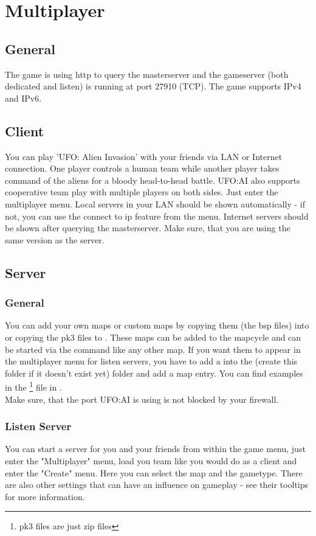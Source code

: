 \section{Multiplayer}
\subsection{General}
The game is using http to query the masterserver and the gameserver (both dedicated and listen) is running at port 27910 (TCP). The game supports IPv4 and IPv6.

\subsection{Client}
You can play 'UFO: Alien Invasion' with your friends via LAN or Internet connection. One player controls a human team while another player takes command of the aliens for a bloody head-to-head battle. UFO:AI also supports cooperative team play with multiple players on both sides. Just enter the multiplayer menu. Local servers in your LAN should be shown automatically - if not, you can use the connect to ip feature from the menu. Internet servers should be shown after querying the masterserver. Make sure, that you are using the same version as the server.

\subsection{Server}
\subsubsection{General}
You can add your own maps or custom maps by copying them (the bsp files) into  or copying the pk3 files to . These maps can be added to the mapcycle and can be started via the  command like any other map. If you want them to appear in the multiplayer menu for listen servers, you have to add a  into the  (create this folder if it doesn't exist yet) folder and add a map entry. You can find examples in the \footnote{pk3 files are just zip files} file in .\\
Make sure, that the port UFO:AI is using is not blocked by your firewall.

\subsubsection{Listen Server}
You can start a server for you and your friends from within the game menu, just enter the "Multiplayer" menu, load you team like you would do as a client and enter the "Create" menu. Here you can select the map and the gametype. There are also other settings that can have an influence on gameplay - see their tooltips for more information.

